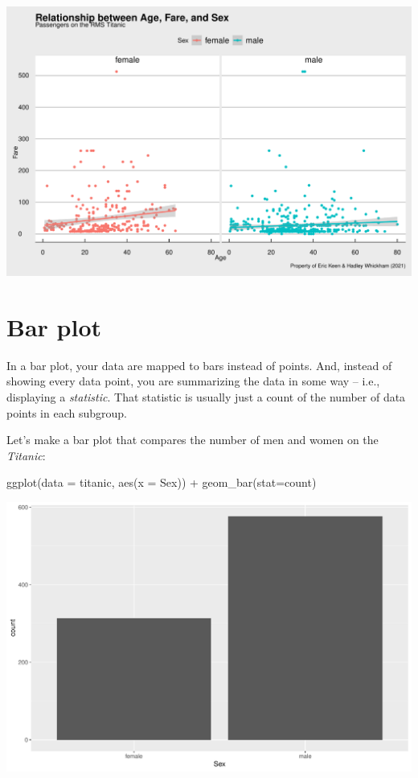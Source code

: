 \documentclass[
]{book}
\newenvironment{Shaded}{\begin{snugshade}}{\end{snugshade}}
\newcommand{\AttributeTok}[1]{\textcolor[rgb]{0.77,0.63,0.00}{#1}}
\newcommand{\FunctionTok}[1]{\textcolor[rgb]{0.00,0.00,0.00}{#1}}
\newcommand{\NormalTok}[1]{#1}
\newcommand{\SpecialCharTok}[1]{\textcolor[rgb]{0.00,0.00,0.00}{#1}}
\newcommand{\StringTok}[1]{\textcolor[rgb]{0.31,0.60,0.02}{#1}}
\begin{document}
\includegraphics[width=694.08px]{figures/unnamed-chunk-164-1}

\hypertarget{bar-plot}{%
\section*{Bar plot}\label{bar-plot}}

In a bar plot, your data are mapped to bars instead of points. And, instead of showing every data point, you are summarizing the data in some way -- i.e., displaying a \emph{statistic}. That statistic is usually just a count of the number of data points in each subgroup.

Let's make a bar plot that compares the number of men and women on the \emph{Titanic}:

\begin{Shaded}
\begin{Highlighting}[]
\FunctionTok{ggplot}\NormalTok{(}\AttributeTok{data =}\NormalTok{ titanic, }
       \FunctionTok{aes}\NormalTok{(}\AttributeTok{x =}\NormalTok{ Sex)) }\SpecialCharTok{+} 
  \FunctionTok{geom\_bar}\NormalTok{(}\AttributeTok{stat=}\StringTok{\textquotesingle{}count\textquotesingle{}}\NormalTok{)}
\end{Highlighting}
\end{Shaded}

\includegraphics[width=694.08px]{figures/unnamed-chunk-165-1}
\end{document}

